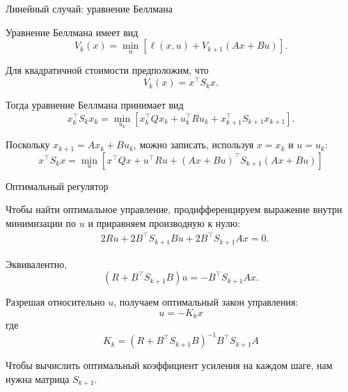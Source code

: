 \documentclass{beamer}
\begin{document}
	
	
	\begin{frame}{Линейный случай: уравнение Беллмана}
		\begin{flushleft}
			
			Уравнение Беллмана имеет вид
			\[
			V_k(x)=\min_u
			\left[
			\ell(x,u)+V_{k+1}(Ax+Bu)
			\right].
			\]
			
			Для квадратичной стоимости предположим, что
			\[
			V_k(x)=x^\top S_kx.
			\]
			
			Тогда уравнение Беллмана принимает вид
			\[
			x_k^\top S_kx_k
			=\min_{u_k}\left[
			x_k^\top Qx_k+u_k^\top Ru_k
			+x_{k+1}^\top S_{k+1}x_{k+1}
			\right].
			\]
			
			\medskip
			
			Поскольку $x_{k+1}=Ax_k+Bu_k$, можно записать,
			используя $x=x_k$ и $u=u_k$:
			\[
			\boxed{
				x^\top S_kx=\min_u
				\left[
				x^\top Qx+u^\top Ru
				+(Ax+Bu)^\top S_{k+1}(Ax+Bu)
				\right]
			}
			\]
			
		\end{flushleft}
	\end{frame}
	
	\begin{frame}{Оптимальный регулятор}
		\begin{flushleft}
			
			Чтобы найти оптимальное управление, продифференцируем
			выражение внутри минимизации по $u$
			и приравняем производную к нулю:
			\[
			\begin{aligned}
				&2Ru+2B^\top S_{k+1}Bu +2B^\top S_{k+1}Ax=0.
			\end{aligned}
			\]
			
			Эквивалентно,
			\[
			(R+B^\top S_{k+1}B)u
			=-B^\top S_{k+1}Ax.
			\]
			
			\medskip
			
			Разрешая относительно $u$, получаем оптимальный закон управления:
			\[
			\boxed{
				u=-K_kx
			}
			\]
			где
			\[
			\boxed{
				K_k=(R+B^\top S_{k+1}B)^{-1}
				B^\top S_{k+1}A
			}
			\]
			
			\medskip
			
			Чтобы вычислить оптимальный коэффициент усиления на каждом шаге,
			нам нужна матрица $S_{k+1}$.
			
		\end{flushleft}
	\end{frame}
	
\end{document}
